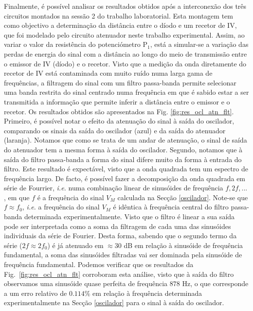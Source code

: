 Finalmente, é possível analisar os resultados obtidos após a interconexão dos três circuitos montados na sessão 2 do trabalho laboratorial. Esta montagem tem como objectivo a determinação da distância entre o díodo e um recetor de IV, que foi modelado pelo circuito atenuador neste trabalho experimental. Assim, ao variar o valor da resistência do potenciómetro $\mathrm{P_1}$, está a simular-se a variação das perdas de energia do sinal com a distância ao longo do meio de transmissão entre o emissor de IV (díodo) e o recetor. Visto que a medição da onda diretamente do recetor de IV está contaminada com muito ruído numa larga gama de frequências, a filtragem do sinal com um filtro passa-banda permite selecionar uma banda restrita do sinal centrado numa frequência em que é sabido estar a ser transmitida a informação que permite inferir a distância entre o emissor e o recetor. Os resultados obtidos são apresentados na Fig. \ref{fig:res_ocl_atn_flt}. Primeiro, é possível notar o efeito da atenuação do sinal à saída do oscilador, comparando os sinais da saída do oscilador (azul) e da saída do atenuador (laranja). Notamos que como se trata de um andar de atenuação, o sinal de saída do atenuador tem a mesma forma à saída do oscilador. Segundo, notamos que à saída do filtro passa-banda a forma do sinal difere muito da forma à entrada do filtro. Este resultado é expectável, visto que a onda quadrada tem um espectro de frequência largo. De facto, é possível fazer a decomposição da onda quadrada em série de Fourrier, \textit{i.e.} numa combinação linear de sinusóides de frequência $f, 2f,... $, em que $f$ é a frequência do sinal $V_M$ calculada na Secção \ref{oscilador}. Note-se que $f\approx f_0$, \textit{i.e.} a frequência do sinal $V_M$ é idêntica à frequência central do filtro passa-banda determinada experimentalmente. Visto que o filtro é linear a sua saída pode ser interpretada como a soma da filtragem de cada uma das sinusóides individuais da série de Fourier. Desta forma, sabendo que o segundo termo da série ($2f \approx 2f_0$) é já atenuado em $\approx 30 $ dB em relação à sinusóide de frequência fundamental, a soma das sinusóides filtradas vai ser dominada pela sinusóide de frequência fundamental. Podemos verificar que os resultados da Fig.~\ref{fig:res_ocl_atn_flt} corroboram esta análise, visto que à saída do filtro observamos uma sinusóide quase perfeita de frequência $878$ Hz, o que corresponde a um erro relativo de $0.114$\% em relação à frequência determinada experimentalmente na Secção \ref{oscilador} para o sinal à saída do oscilador.

